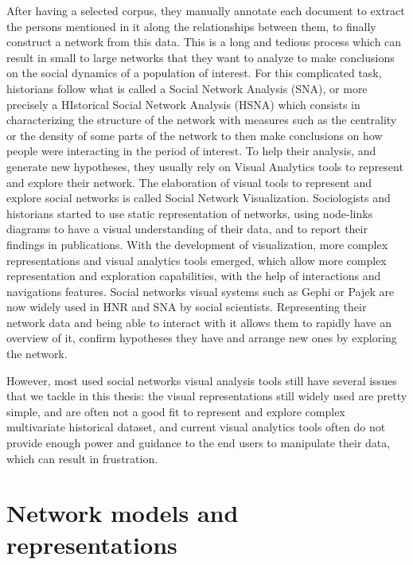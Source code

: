 After having a selected corpus, they manually annotate each document to extract the persons mentioned in it along the relationships between them, to finally construct a network from this data.
This is a long and tedious process which can result in small to large networks that they want to analyze to make conclusions on the social dynamics of a population of interest.
For this complicated task, historians follow what is called a Social Network Analysis (SNA), or more precisely a HIstorical Social Network Analysis (HSNA) which consists in characterizing the structure of the network with measures such as the centrality or the density of some parts of the network to then make conclusions on how people were interacting in the period of interest. To help their analysis, and generate new hypotheses, they usually rely on Visual Analytics tools to represent and explore their network. The elaboration of visual tools to represent and explore social networks is called Social Network Visualization.
Sociologists and historians started to use static representation of networks, using node-links diagrams to have a visual understanding of their data, and to report their findings in publications. With the development of visualization, more complex representations and visual analytics tools emerged, which allow more complex representation and exploration capabilities, with the help of interactions and navigations features. Social networks visual systems such as Gephi or Pajek are now widely used in HNR and SNA by social scientists. Representing their network data and being able to interact with it allows them to rapidly have an overview of it, confirm hypotheses they have and arrange new ones by exploring the network.

However, most used social networks visual analysis tools still have several issues that we tackle in this thesis: the visual representations still widely used are pretty simple, and are often not a good fit to represent and explore complex multivariate historical dataset, and current visual analytics tools often do not provide enough power and guidance to the end users to manipulate their data, which can result in frustration.

\section{Network models and representations}

